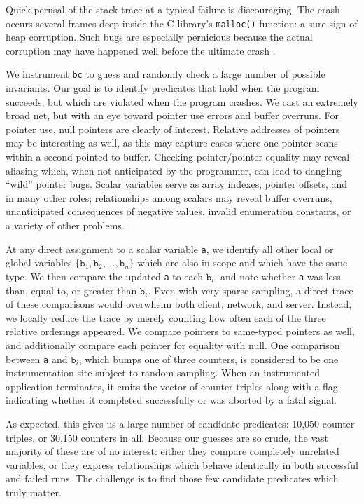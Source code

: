 Quick perusal of the stack trace at a typical failure is discouraging.
The crash occurs several frames deep inside the C library's
\texttt{malloc()} function: a sure sign of heap corruption.  Such bugs
are especially pernicious because the actual corruption may have
happened well before the ultimate crash \cite{Eisenstadt1993b}.

We instrument \texttt{bc} to guess and randomly check a large number
of possible invariants.  Our goal is to identify predicates that hold
when the program succeeds, but which are violated when the program
crashes.  We cast an extremely broad net, but with an eye toward
pointer use errors and buffer overruns.  For pointer use, null
pointers are clearly of interest.  Relative addresses of pointers may
be interesting as well, as this may capture cases where one pointer
scans within a second pointed-to buffer.  Checking pointer/pointer
equality may reveal aliasing which, when not anticipated by the
programmer, can lead to dangling ``wild'' pointer bugs.  Scalar
variables serve as array indexes, pointer offsets, and in many other
roles; relationships among scalars may reveal buffer overruns,
unanticipated consequences of negative values, invalid enumeration
constants, or a variety of other problems.

At any direct assignment to a scalar variable \texttt{a}, we identify
all other local or global variables $\{ \mathtt{b}_1, \mathtt{b}_2,
\dots, \mathtt{b}_n \}$ which are also in scope and which have the
same type.  We then compare the updated \texttt{a} to each
$\mathtt{b}_i$, and note whether \texttt{a} was less than, equal to,
or greater than $\mathtt{b}_i$.  Even with very sparse sampling, a
direct trace of these comparisons would overwhelm both client,
network, and server.  Instead, we locally reduce the trace by merely
counting how often each of the three relative orderings appeared.  We
compare pointers to same-typed pointers as well, and additionally
compare each pointer for equality with null.  One comparison between
\texttt{a} and $\mathtt{b}_i$, which bumps one of three counters, is
considered to be one instrumentation site subject to random sampling.
When an instrumented application terminates, it emits the vector of
counter triples along with a flag indicating whether it completed
successfully or was aborted by a fatal signal.

As expected, this gives us a large number of candidate predicates:
10,050 counter triples, or 30,150 counters in all.  Because our
guesses are so crude, the vast majority of these are of no interest:
either they compare completely unrelated variables, or they express
relationships which behave identically in both successful and failed
runs.  The challenge is to find those few candidate predicates which
truly matter.

